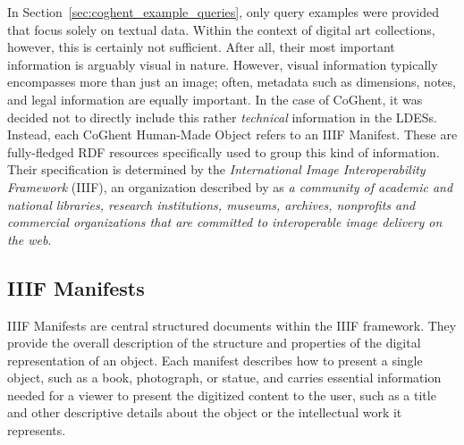 In Section~\ref{sec:coghent_example_queries}, only query examples were provided that focus solely on textual data. Within the context of digital art collections, however, this is certainly not sufficient. After all, their most important information is arguably visual in nature. However, visual information typically encompasses more than just an image; often, metadata such as dimensions, notes, and legal information are equally important. In the case of CoGhent, it was decided not to directly include this rather \textit{technical} information in the LDESs. Instead, each CoGhent Human-Made Object refers to an IIIF Manifest. These are fully-fledged RDF resources specifically used to group this kind of information. Their specification is determined by the \textit{International Image Interoperability Framework} (IIIF), an organization described by \citet{snydman2015international} as \textit{a community of academic and national libraries, research institutions, museums, archives, nonprofits and commercial organizations that are committed to interoperable image delivery on the web}. \citep{floreverk2022coghent} \citep{snydman2015international}

\subsection{IIIF Manifests}

IIIF Manifests are central structured documents within the IIIF framework. They provide the overall description of the structure and properties of the digital representation of an object. Each manifest describes how to present a single object, such as a book, photograph, or statue, and carries essential information needed for a viewer to present the digitized content to the user, such as a title and other descriptive details about the object or the intellectual work it represents. \citep{appleby2017presentation}

